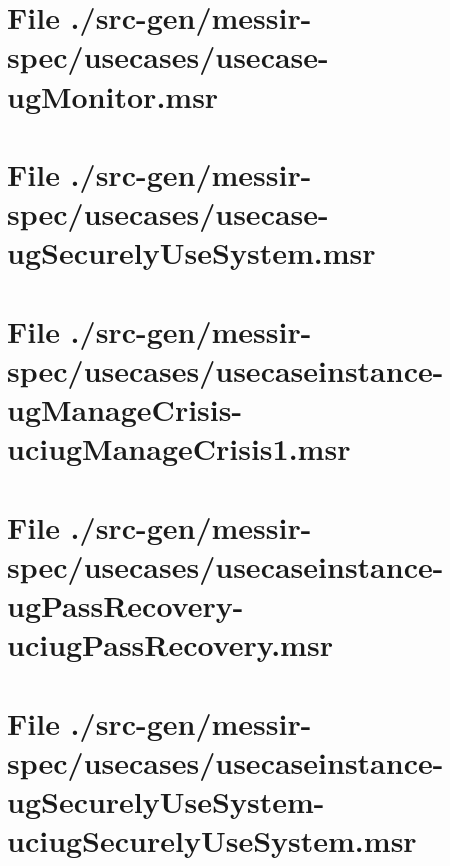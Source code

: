 \section[File /src-gen/messir-spec/usecases/usecase-ugMonitor.msr]{File ./src-gen/messir-spec/usecases/usecase-ugMonitor.msr}
\scriptsize

\normalsize
	
\section[File /src-gen/messir-spec/usecases/usecase-ugSecurelyUseSystem.msr]{File ./src-gen/messir-spec/usecases/usecase-ugSecurelyUseSystem.msr}
\scriptsize

\normalsize
	
\section[File /src-gen.../usecaseinstance-ugManageCrisis-uciugManageCrisis1.msr]{File ./src-gen/messir-spec/usecases/usecaseinstance-ugManageCrisis-uciugManageCrisis1.msr}
\scriptsize

\normalsize
	
\section[File /src-gen.../usecaseinstance-ugPassRecovery-uciugPassRecovery.msr]{File ./src-gen/messir-spec/usecases/usecaseinstance-ugPassRecovery-uciugPassRecovery.msr}
\scriptsize

\normalsize
	
\section[File /src-gen.../usecaseinstance-ugSecurelyUseSystem-uciugSecurelyUseSystem.msr]{File ./src-gen/messir-spec/usecases/usecaseinstance-ugSecurelyUseSystem-uciugSecurelyUseSystem.msr}
\scriptsize

\normalsize
	
